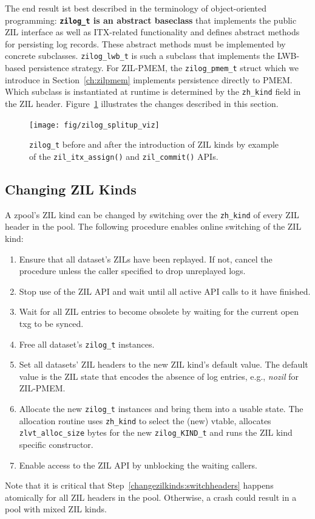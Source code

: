 \documentclass[12pt,a4paper,twoside]{book}
\begin{document}
The end result ist best described in the terminology of object-oriented programming:
\textbf{\lstinline{zilog_t} is an abstract baseclass} that implements the public ZIL interface as well as ITX-related functionality and defines abstract methods for persisting log records.
These abstract methods must be implemented by concrete subclasses.
\lstinline{zilog_lwb_t} is such a subclass that implements the LWB-based persistence strategy.
For ZIL-PMEM, the \lstinline{zilog_pmem_t} struct which we introduce in Section~\ref{ch:zilpmem} implements persistence directly to PMEM.
Which subclass is instantiated at runtime is determined by the \lstinline{zh_kind} field in the ZIL header.
Figure~\ref{fig:zilog_splitup_viz} illustrates the changes described in this section.

\begin{figure}[H]
    \centering
    \texttt{[image: fig/zilog\_splitup\_viz]}
    \caption{\lstinline{zilog_t} before and after the introduction of ZIL kinds by example of the \lstinline{zil_itx_assign()} and \lstinline{zil_commit()} APIs.}
    \label{fig:zilog_splitup_viz}
\end{figure}


\subsection{Changing ZIL Kinds}\label{sec:zil_kinds:change}
A zpool's ZIL kind can be changed by switching over the \lstinline{zh_kind} of every ZIL header in the pool.
The following procedure enables online switching of the ZIL kind:
\begin{enumerate}[noitemsep]
    \item Ensure that all dataset's ZILs have been replayed. If not, cancel the procedure unless the caller specified to drop unreplayed logs.
    \item Stop use of the ZIL API and wait until all active API calls to it have finished.
    \item Wait for all ZIL entries to become obsolete by waiting for the current open txg to be synced.
    \item Free all dataset's \lstinline{zilog_t} instances.
    \item \label{changezilkinds:switchheaders} Set all datasets' ZIL headers to the new ZIL kind's default value.
        The default value is the ZIL state that encodes the absence of log entries, e.g., \textit{nozil} for ZIL-PMEM.
    \item Allocate the new \lstinline{zilog_t} instances and bring them into a usable state.
        The allocation routine uses \lstinline{zh_kind} to select the (new) vtable, allocates \lstinline{zlvt_alloc_size} bytes for the new \lstinline{zilog_KIND_t} and runs the ZIL kind specific constructor.
    \item Enable access to the ZIL API by unblocking the waiting callers.
\end{enumerate}
Note that it is critical that Step~\ref{changezilkinds:switchheaders} happens atomically for all ZIL headers in the pool.
Otherwise, a crash could result in a pool with mixed ZIL kinds.
\end{document}
